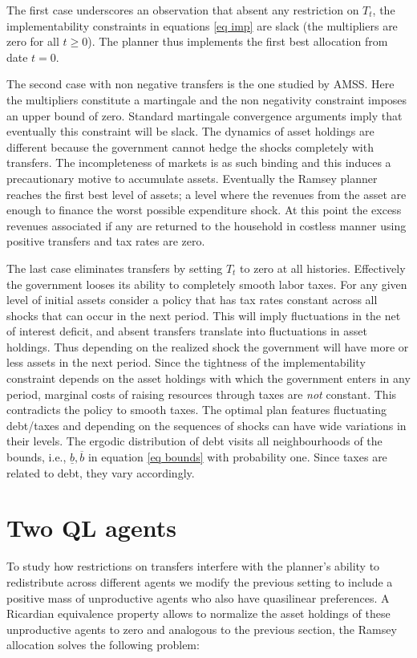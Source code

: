 \documentclass[thmsb,11pt]{article}
\begin{document}
The first case underscores an observation that absent any restriction on $T_t$, the implementability  constraints in equations \ref{eq imp} are  slack (the multipliers are zero for all $t\geq 0$). The planner thus implements the first best allocation from date $t=0$. 

The second case with non negative transfers is the one studied by AMSS. Here the multipliers constitute a martingale and the non negativity constraint imposes an upper bound of zero. Standard martingale convergence arguments imply that eventually this constraint will be slack. The dynamics of asset holdings are different because the government cannot hedge the shocks completely with transfers. The incompleteness of markets is as such binding and  this induces a precautionary motive to accumulate assets. Eventually the Ramsey planner reaches the first best level of assets; a level where the revenues from the asset are enough to finance the worst possible expenditure shock. At this point the excess revenues associated if any are returned to the household in  costless manner using positive transfers and tax rates are zero.



The last case eliminates transfers by setting $T_t$ to zero at all histories. Effectively the government looses its ability to completely smooth labor taxes. For any given level of initial assets consider a policy that has tax rates constant across all shocks that can occur in the next period. This will imply fluctuations in the net of interest deficit, and absent transfers translate into fluctuations in asset holdings. Thus depending on the realized shock the government will have more or less assets in the next period. Since the tightness of the implementability constraint depends on the asset holdings with which the government enters in any period, marginal costs of raising resources through taxes are \emph{not} constant. This contradicts the policy to smooth taxes. The optimal plan features fluctuating debt/taxes and depending on the sequences of shocks can have wide variations in their levels. The ergodic distribution of debt visits all neighbourhoods of the bounds, i.e., $\underline{b},\overline{b}$ in equation \eqref{eq bounds} with probability one. Since taxes are related to debt, they vary accordingly.


\section{Two QL agents}
To study how restrictions on transfers interfere with the planner's ability to redistribute across different agents we modify the previous setting to include a positive mass of unproductive agents who also have quasilinear preferences. A Ricardian equivalence property allows to normalize the asset holdings of these unproductive agents to zero and analogous to the previous section, the Ramsey allocation solves the following problem:
\end{document}
